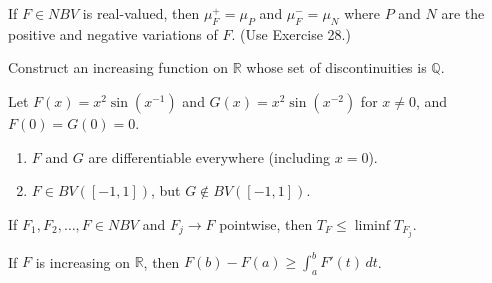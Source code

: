 	\begin{exercise}[Folland 3.29]
		If $F \in NBV$ is real-valued, then $\mu_F^+ = \mu_P$ and $\mu_F^- = \mu_N$ where $P$ and $N$ are the positive and negative variations of $F$. (Use Exercise 28.)
	\end{exercise}
	\begin{solution}

	\end{solution}

	\begin{exercise}[Folland 3.30]
		Construct an increasing function on $\mathbb{R}$ whose set of discontinuities is $\mathbb{Q}$.
	\end{exercise}
	\begin{solution}

	\end{solution}

	\begin{exercise}[Folland 3.31]
		Let $F(x) = x^2 \sin(x^{-1})$ and $G(x) = x^2 \sin(x^{-2})$ for $x \neq 0$, and $F(0) = G(0) = 0$.
		\begin{enumerate}[label=\textbf{\alph*.}]
			\item $F$ and $G$ are differentiable everywhere (including $x = 0$).
			\item $F \in BV([-1, 1])$, but $G \notin BV([-1, 1])$.
		\end{enumerate}
	\end{exercise}
	\begin{solution}

	\end{solution}

	\begin{exercise}[Folland 3.32]
		If $F_1, F_2, \dots, F \in NBV$ and $F_j \to F$ pointwise, then $T_F \le \liminf T_{F_j}$.
	\end{exercise}
	\begin{solution}

	\end{solution}

	\begin{exercise}[Folland 3.33]
		If $F$ is increasing on $\mathbb{R}$, then $F(b) - F(a) \ge \int_a^b F'(t) \, dt$.
	\end{exercise}
	\begin{solution}

	\end{solution}

